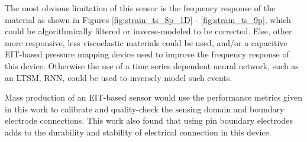 The most obvious limitation of this sensor is the frequency response of the material as shown in Figures \ref{fig:strain_ts_8p_1D} - \ref{fig:strain_ts_9p}, which could be algorithmically filtered or inverse-modeled to be corrected. Else, other more responsive, less viscoelastic materials could be used, and/or a capacitive EIT-based pressure mapping device used to improve the frequency response of this device. Otherwise the use of a time series dependent neural network, such as an LTSM, RNN, could be used to inversely model such events.

Mass production of an EIT-based sensor would use the performance metrics given in this work to calibrate and quality-check the sensing domain and boundary electrode connections. This work also found that using pin boundary electrodes adds to the durability and stability of electrical connection in this device.




